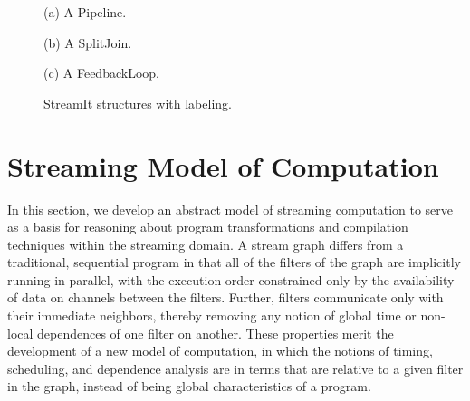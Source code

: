 
\begin{figure}
\centering
{}

(a) A Pipeline. \\
\vspace{6pt}

(b) A SplitJoin. \\
\vspace{6pt}

(c) A FeedbackLoop. \\
\vspace{-6pt}
\caption{StreamIt structures with labeling.}
\vspace{-12pt}
\label{fig:tapelabels}
\end{figure}

\section{Streaming Model of Computation}

In this section, we develop an abstract model of streaming computation
to serve as a basis for reasoning about program transformations and
compilation techniques within the streaming domain.  A stream graph
differs from a traditional, sequential program in that all of the
filters of the graph are implicitly running in parallel, with the
execution order constrained only by the availability of data on
channels between the filters.  Further, filters communicate only with
their immediate neighbors, thereby removing any notion of global time
or non-local dependences of one filter on another.  These properties
merit the development of a new model of computation, in which the
notions of timing, scheduling, and dependence analysis are in terms
that are relative to a given filter in the graph, instead of being
global characteristics of a program.

